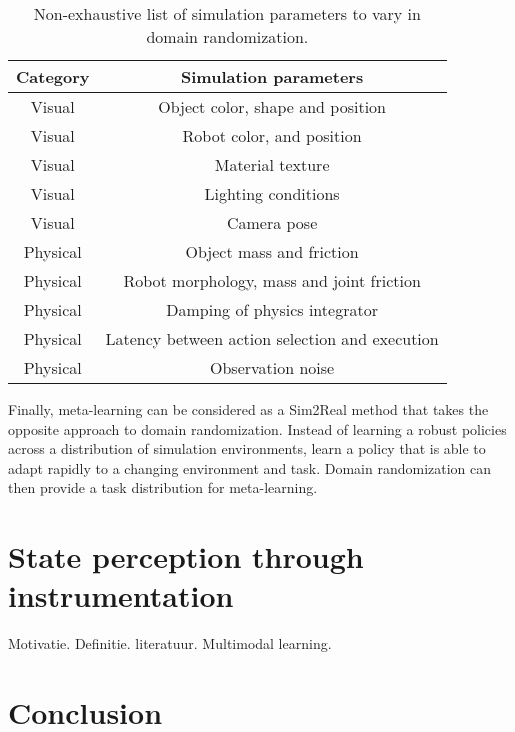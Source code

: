 \documentclass[\home/main.tex]{subfiles}
\begin{document}
\begin{table}[htb]
\centering
\caption{Non-exhaustive list of simulation parameters to vary in domain randomization.}
\begin{tabular}[t]{c c}
	\toprule
	Category    &   Simulation parameters	 						\\
	\midrule
	Visual     	&   Object color, shape and position				\\
	Visual     	&   Robot color, and position						\\
	Visual		&   Material texture								\\
	Visual     	&   Lighting conditions								\\
	Visual     	&   Camera pose										\\
	Physical	& 	Object mass and friction 						\\
	Physical	& 	Robot morphology, mass and joint friction 		\\
	Physical	&  	Damping of physics integrator					\\
	Physical	& 	Latency between action selection and execution 	\\
	Physical	& 	Observation noise 								\\
	\bottomrule
\end{tabular}
\label{table:simulation_parameters_example}
\end{table}

Finally, meta-learning can be considered as a Sim2Real method that takes the opposite approach to domain randomization. Instead of learning a robust policies across a distribution of simulation environments, learn a policy that is able to adapt rapidly to a changing environment and task. Domain randomization can then provide a task distribution for meta-learning. 

\section{State perception through instrumentation} \label{sec:lit_instrumentation}
Motivatie.
Definitie.
literatuur.
Multimodal learning.


\section{Conclusion}

\end{document}
